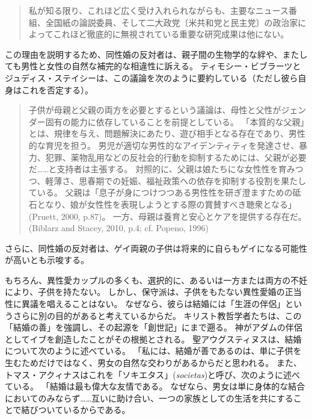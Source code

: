 \documentclass[paper=a4,book,openany]{jlreq}
\begin{document}
\begin{quote}
私が知る限り、これほど広く受け入れられながらも、主要なニュース番組、全国紙の論説委員、そして二大政党〔米共和党と民主党〕の政治家によってこれほど徹底的に無視されている重要な研究成果は他にない。
\citep[p.162]{murray12:_comin_apart}
\end{quote}

この理由を説明するため、同性婚の反対者は、親子間の生物学的な絆や、またしても男性と女性の自然な補完的な相違性に訴える。
ティモシー・ビブラーツとジュディス・ステイシーは、この議論を次のように要約している（ただし彼ら自身はこれを否定する）。

\begin{quote}
子供が母親と父親の両方を必要とするという議論は、母性と父性がジェンダー固有の能力に依存していることを前提としている。
「本質的な父親」とは、規律を与え、問題解決にあたり、遊び相手となる存在であり、男性的な育児を担う。
男児が適切な男性的なアイデンティティを発達させ、暴力、犯罪、薬物乱用などの反社会的行動を抑制するためには、父親が必要だ……と支持者は主張する。
対照的に、父親は娘たちにな女性性を育みつつ、軽薄さ、思春期での妊娠、福祉政策への依存を抑制する役割を果たしている。
父親は「息子が身につけつつある男性性を研ぎ澄ますための砥石となり、娘が女性性を表現しようとする際の賞賛すべき聴衆となる」(Pruett, 2000, p.87)。
一方、母親は養育と安心とケアを提供する存在だ。
(Biblarz and Stacey, 2010, p.4; cf. Popeno, 1996)
\nocite{biblarz10:_how_does_gender_paren_matter}\nocite{pruett00:_father}\nocite{popenoe96:_life_father}

\end{quote}

さらに、同性婚の反対者は、ゲイ両親の子供は将来的に自らもゲイになる可能性が高いとも示唆する。

もちろん、異性愛カップルの多くも、選択的に、あるいは一方または両方の不妊により、子供を持たない。
しかし、保守派は、子供をもたない異性愛婚の正当性に異議を唱えることはない。
なぜなら、彼らは結婚には「生涯の伴侶」というさらに別の目的があると考えているからだ。
キリスト教哲学者たちは、この「結婚の善」を強調し、その起源を「創世記」にまで遡る。
神がアダムの伴侶としてイブを創造したことがその根拠とされる。
聖アウグスティヌスは、結婚について次のように述べている。
「私には、結婚が善であるのは、単に子供を生むためだけではなく、男女の自然な交わりがあるからだと思われる\citep[3.3]{augustine98:_excel_marriag}。
また、トマス・アクィナスはこれを「ソキエタス」(\emph{societas})と呼び、次のように述べている。
「結婚は最も偉大な友情である。
なぜなら、男女は単に身体的な結合においてのみならず……互いに助け合い、一つの家族としての生活を共にすることで結びついているからである\citep[III c. 123 n. 6 (2964)]{aquinas55:_summa_gentil}。
\end{document}
